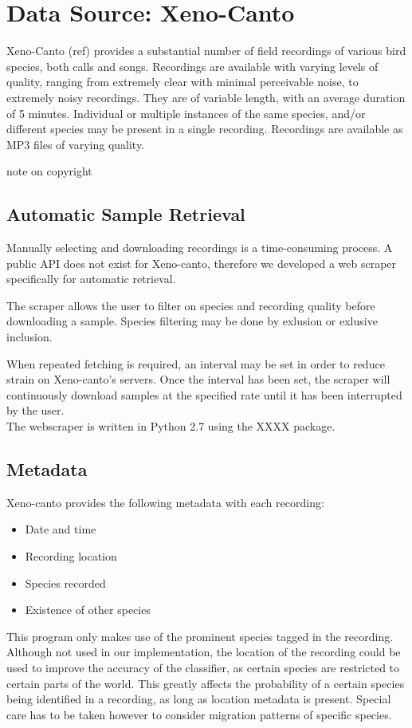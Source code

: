 \section{Data Source: Xeno-Canto}

Xeno-Canto (ref) provides a substantial number of field recordings of various
bird species, both calls and songs.
Recordings are available with varying levels of quality, ranging from extremely
clear with minimal perceivable noise, to extremely noisy recordings.
They are of variable length, with an average duration of 5 minutes.
Individual or multiple instances of the same species, and/or
different species may be present in a single recording.
Recordings are available as MP3 files of varying quality.

note on copyright


\subsection{Automatic Sample Retrieval}
Manually selecting and downloading recordings is a time-consuming process.
A public API does not exist for Xeno-canto, therefore we developed a web scraper
specifically for automatic retrieval.

The scraper allows the user to filter on species and recording quality before
downloading a sample.
Species filtering may be done by exlusion or exlusive inclusion.

When repeated fetching is required, an interval may be set in order to reduce
strain on Xeno-canto's servers.
Once the interval has been set, the scraper will continuously download samples
at the specified rate until it has been interrupted by the user.\\

The webscraper is written in Python 2.7 using the XXXX package.

\subsection{Metadata}
Xeno-canto provides the following metadata with each recording:
\begin{itemize}[noitemsep]
  \item Date and time
  \item Recording location
  \item Species recorded
  \item Existence of other species
\end{itemize}

This program only makes use of the prominent species tagged in the recording.
Although not used in our implementation, the location of the recording could be
used to improve the accuracy of the classifier, as certain species are restricted
to certain parts of the world.
This greatly affects the probability of a certain species being identified in
a recording, as long as location metadata is present.
Special care has to be taken however to consider migration patterns of specific
species.
